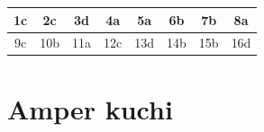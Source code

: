 \begin{table}[!ht]
\centering
\begin{tabular}{|c|c|c|c|c|c|c|c|}
\hline
1c & 2c & 3d & 4a & 5a & 6b & 7b & 8a \\ \hline
9c & 10b & 11a & 12c & 13d & 14b & 15b & 16d \\ \hline
\end{tabular}
\end{table}









\section{Amper kuchi}



